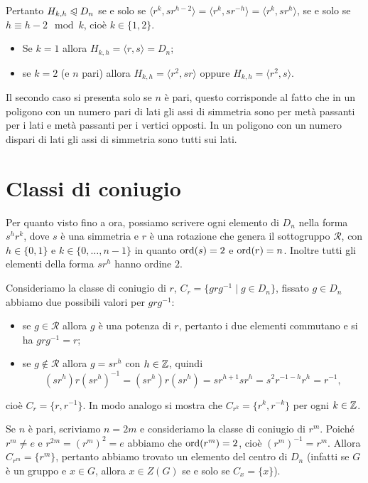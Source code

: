\documentclass[11pt]{scrartcl}
\begin{document}
Pertanto $H_{k, h}\trianglelefteqslant D_n$ se e solo se $\langle r^k, sr^{h - 2}\rangle
= \langle r^k, sr^{-h}\rangle = \langle r^k, sr^h\rangle$, se e solo se 
$h \equiv h - 2 \mod k$, cioè $k \in \{1, 2\}$.\begin{itemize}
    \item Se $k = 1$ allora $H_{k, h} = \langle r, s\rangle = D_n$;
    \item se $k = 2$ (e $n$ pari) allora $H_{k, h} = \langle r^2, sr\rangle$ oppure 
    $H_{k, h} = \langle r^2, s\rangle$.
\end{itemize}

\begin{remark}
    Il secondo caso si presenta solo se $n$ è pari, questo corrisponde al fatto 
    che in un poligono con un numero pari di lati gli assi di simmetria sono 
    per metà passanti per i lati e metà passanti per i vertici opposti. In un poligono con un numero dispari
    di lati gli assi di simmetria sono tutti sui lati.
\end{remark}


\section{Classi di coniugio}

Per quanto visto fino a ora, possiamo scrivere ogni elemento di $D_n$ nella
forma $s^hr^k$, dove $s$ è una simmetria e $r$ è una rotazione che genera
il sottogruppo $\mathcal{R}$, con $h \in \{0, 1\}$ e $k \in \{0, \ldots, n - 1\}$
in quanto $\operatorname{ord}(s)= 2$ e $\operatorname{ord}(r) = n$. Inoltre tutti gli elementi della
forma $sr^h$ hanno ordine $2$.

Consideriamo la classe di coniugio di $r$, $C_r = \{grg^{-1}\mid g \in D_n\}$,
fissato $g \in D_n$ abbiamo due possibili valori per $grg^{-1}$:
\begin{itemize}
    \item se $g \in \mathcal{R}$ allora $g$ è una potenza di $r$, pertanto i
    due elementi commutano e si ha $grg^{-1} = r$;
    \item se $g\notin\mathcal{R}$ allora $g = sr^h$ con $h \in \mathbb Z$, quindi
    \[
        (sr^h)r(sr^h)^{-1} = (sr^h)r(sr^h) = sr^{h + 1}sr^h = s^2r^{-1-h}r^h = r^{-1},
    \]
\end{itemize}
cioè $C_r = \{r, r^{-1}\}$. In modo analogo si mostra che $C_{r^k} = \{r^k, r^{-k}\}$
per ogni $k \in \mathbb Z$.

\begin{remark}
    Se $n$ è pari, scriviamo $n = 2m$ e consideriamo la classe di coniugio
    di $r^m$. Poiché $r^m \neq e$ e $r^{2m} = (r^m)^2 = e$ abbiamo che
    $\operatorname{ord}(r^m) = 2$, cioè $(r^m)^{-1} = r^m$. Allora $C_{r^m} = \{r^m\}$,
    pertanto abbiamo trovato un elemento del centro di $D_n$ (infatti se $G$
    è un gruppo e $x \in G$, allora $x \in Z(G)$ se e solo se $C_x = \{x\}$).
\end{remark}
\end{document}
